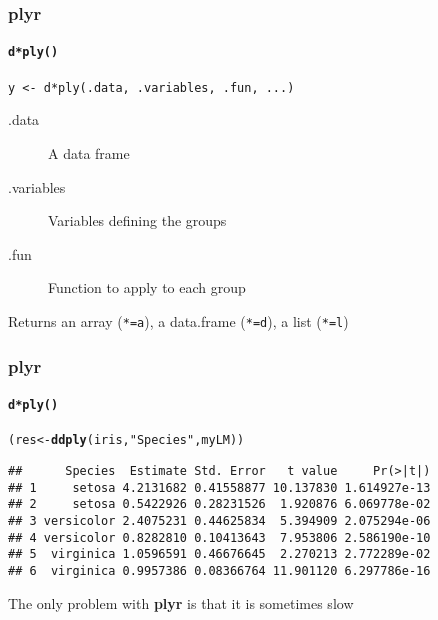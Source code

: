 \documentclass[paper=screen,mathserif]{beamer}\usepackage[]{graphicx}\usepackage[]{color}
\makeatletter
\newcommand{\hlstr}[1]{\textcolor[rgb]{0.192,0.494,0.8}{#1}}%
\newcommand{\hlstd}[1]{\textcolor[rgb]{0.345,0.345,0.345}{#1}}%
\newcommand{\hlkwb}[1]{\textcolor[rgb]{0.69,0.353,0.396}{#1}}%
\newcommand{\hlkwd}[1]{\textcolor[rgb]{0.737,0.353,0.396}{\textbf{#1}}}%
\newenvironment{kframe}{%
 \def\at@end@of@kframe{}%
 \ifinner\ifhmode%
  \def\at@end@of@kframe{\end{minipage}}%
  \begin{minipage}{\columnwidth}%
 \fi\fi%
 \def\FrameCommand##1{\hskip\@totalleftmargin \hskip-\fboxsep
 \colorbox{shadecolor}{##1}\hskip-\fboxsep
     \hskip-\linewidth \hskip-\@totalleftmargin \hskip\columnwidth}%
 \MakeFramed {\advance\hsize-\width
   \@totalleftmargin\z@ \linewidth\hsize
   \@setminipage}}%
 {\par\unskip\endMakeFramed%
 \at@end@of@kframe}
\newenvironment{knitrout}{}{} %
\newcommand{\ft}[1]{\frametitle{#1}}
\newcommand{\fst}[1]{\framesubtitle{#1}}
\makeatother
\begin{document}
\begin{frame}[fragile]
  \ft{{\bf plyr}}
  \fst{{\tt d*ply()}}
  
  \verb=y <- d*ply(.data, .variables, .fun, ...)=
  \vspace{0.5cm}
  \begin{description}
  \item[.data] A data frame
  \item[.variables] Variables defining the groups
  \item[.fun] Function to apply to each group
  \end{description}
  Returns an array (\verb|*=a|), a data.frame (\verb|*=d|), a list
  (\verb|*=l|)
  
\end{frame}

\begin{frame}[fragile]
  \ft{{\bf plyr}}
  \fst{{\tt d*ply()}}

\begin{knitrout}\scriptsize
{}\color{fgcolor}\begin{kframe}
\begin{alltt}
\hlstd{(res} \hlkwb{<-} \hlkwd{ddply}\hlstd{(iris,} \hlstr{"Species"}\hlstd{, myLM))}
\end{alltt}
\begin{verbatim}
##      Species  Estimate Std. Error   t value     Pr(>|t|)
## 1     setosa 4.2131682 0.41558877 10.137830 1.614927e-13
## 2     setosa 0.5422926 0.28231526  1.920876 6.069778e-02
## 3 versicolor 2.4075231 0.44625834  5.394909 2.075294e-06
## 4 versicolor 0.8282810 0.10413643  7.953806 2.586190e-10
## 5  virginica 1.0596591 0.46676645  2.270213 2.772289e-02
## 6  virginica 0.9957386 0.08366764 11.901120 6.297786e-16
\end{verbatim}
\end{kframe}
\end{knitrout}

\pause \vspace{0.5cm} 
The only problem with {\bf plyr} is that it
is sometimes slow
\end{frame}
\end{document}
